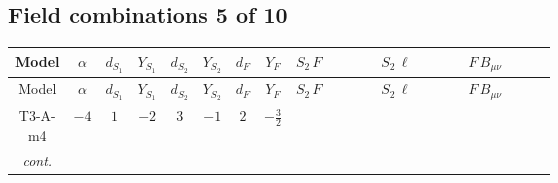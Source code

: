 \documentclass[8pt]{article}
\begin{document}
\begin{landscape}
\subsection*{Field combinations 5 of 10}
\begin{longtable}{@{}cccccccc >{\raggedright\arraybackslash}p{0.21\linewidth} >{\raggedright\arraybackslash}p{0.21\linewidth} >{\raggedright\arraybackslash}p{0.21\linewidth}@{}}
\toprule
Model & $\alpha$ & $d_{S_1}$ & $Y_{S_1}$ & $d_{S_2}$ & $Y_{S_2}$ & $d_F$ & $Y_F$ & $S_2\,F$ & $S_2\,\ell$ & $F\,B_{\mu\nu}$ \\
\midrule
\endfirsthead
\toprule
Model & $\alpha$ & $d_{S_1}$ & $Y_{S_1}$ & $d_{S_2}$ & $Y_{S_2}$ & $d_F$ & $Y_F$ & $S_2\,F$ & $S_2\,\ell$ & $F\,B_{\mu\nu}$ \\
\midrule
\endhead
T3-A-m4 & $-4$ & $1$ & $-2$ & $3$ & $-1$ & $2$ & $-\frac{3}{2}$ & \scriptsize\adjustbox{max width=\linewidth}{$\begin{gathered} +\frac{2}{3} \hbar  \log \left(\frac{\bar{\mu}^{2}}{M_F^2}\right) \overline{y_{2,i_1,r_1}} \overline{y_{2,i_2,r_2}} S_{2,j_2}^2 y_{2,i_1,r_2} y_{2,i_2,r_1} \left(S_{2,j_1}{}^{\dagger }\right){}^2 \\ +\frac{2 C_{S_2^\dagger S_2} \hbar  \log \left(\frac{\bar{\mu}^{2}}{M_F^2}\right) \overline{y_{2,i_1,r_1}} S_{2,j_1} y_{2,i_1,r_1} S_{2,j_1}{}^{\dagger }}{\sqrt{3}} \\ -\frac{4}{3} \hbar  \log \left(\frac{\bar{\mu}^{2}}{M_F^2}\right) \overline{y_{2,i_1,r_1}} \overline{y_{2,i_2,r_2}} S_{2,j_1} S_{2,j_2} y_{2,i_1,r_2} y_{2,i_2,r_1} S_{2,j_1}{}^{\dagger } S_{2,j_2}{}^{\dagger }\end{gathered}$} &  & \scriptsize\adjustbox{max width=\linewidth}{$\begin{gathered} -\frac{9}{2} \hbar  \log \left(\frac{\bar{\mu}^{2}}{M_F^2}\right) B_{\mu _1\mu _2}^2\end{gathered}$} \\
\textit{cont.} &  &  &  &  &  &  &  & \scriptsize\adjustbox{max width=\linewidth}{$\begin{gathered} -\frac{2 \hbar  \log \left(\frac{\bar{\mu}^{2}}{M_F^2}\right) \overline{y_{2,i_1,r_1}} S_{2,j_3} S_{2,j_4} y_{2,i_1,r_1} S_{2,j_1}{}^{\dagger } S_{2,j_2}{}^{\dagger } \mathcal{I}_{S_2,j_1,j_3,j_2,j_4}{}^1 \lambda_{S_2}^{(1)}^{(1)}}{\sqrt{3}} \\ -\frac{2 \hbar  \log \left(\frac{\bar{\mu}^{2}}{M_F^2}\right) \overline{y_{2,i_1,r_1}} S_{2,j_3} S_{2,j_4} y_{2,i_1,r_1} S_{2,j_1}{}^{\dagger } S_{2,j_2}{}^{\dagger } \mathcal{I}_{S_2,j_1,j_3,j_2,j_4}{}^2 \lambda_{S_2}^{(1)}^{(2)}}{\sqrt{3}}\end{gathered}$} &  &  \\

\end{longtable}
\end{landscape}
\end{document}
